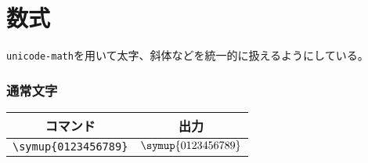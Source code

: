 \chapter{数式}

\verb|unicode-math|を用いて太字、斜体などを統一的に扱えるようにしている。

\subsection{通常文字}

\begin{table}[htbp]
    \centering
    \begin{tabular}{cc}
        \toprule
        コマンド                  & 出力                   \\
        \midrule
        \verb|\symup{0123456789}| & \(\symup{0123456789}\) \\
        \bottomrule
    \end{tabular}
\end{table}

